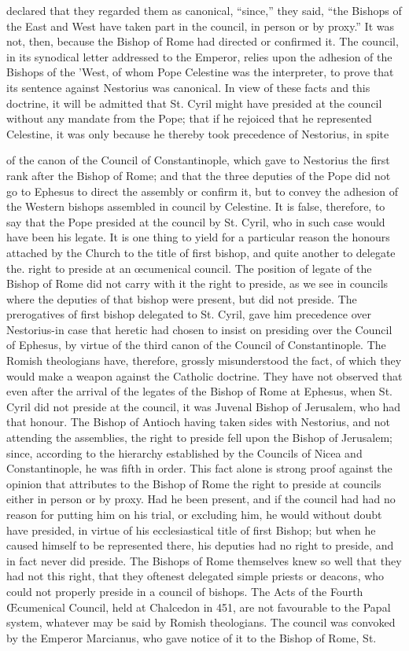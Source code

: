 declared that they regarded them as canonical, “since,” they said, “the Bishops of the East and West have taken part in the council, in person or by proxy.” It was not, then, because the Bishop of Rome had directed or confirmed it. The council, in its synodical letter addressed to the Emperor, relies upon the adhesion of the Bishops of the 'West, of whom Pope Celestine was the interpreter, to prove that its sentence against Nestorius was canonical. In view of these facts and this doctrine, it will be admitted that St. Cyril might have presided at the council without any mandate from the Pope; that if he rejoiced that he represented Celestine, it was only because he thereby took precedence of Nestorius, in spite

of the canon of the Council of Constantinople, which gave to Nestorius the first rank after the Bishop of Rome; and that the three deputies of the Pope did not go to Ephesus to direct the assembly or confirm it, but to convey the adhesion of the Western bishops assembled in council by Celestine. It is false, therefore, to say that the Pope presided at the council by St. Cyril, who in such case would have been his legate. It is one thing to yield for a particular reason the honours attached by the Church to the title of first bishop, and quite another to delegate the. right to preside at an œcumenical council. The position of legate of the Bishop of Rome did not carry with it the right to preside, as we see in councils where the deputies of that bishop were present, but did not preside. The prerogatives of first bishop delegated to St. Cyril, gave him precedence over Nestorius-in case that heretic had chosen to insist on presiding over the Council of Ephesus, by virtue of the third canon of the Council of Constantinople. The Romish theologians have, therefore, grossly misunderstood the fact, of which they would make a weapon against the Catholic doctrine. They have not observed that even after the arrival of the legates of the Bishop of Rome at Ephesus, when St. Cyril did not preside at the council, it was Juvenal Bishop of Jerusalem, who had that honour. The Bishop of Antioch having taken sides with Nestorius, and not attending the assemblies, the right to preside fell upon the Bishop of Jerusalem; since, according to the hierarchy established by the Councils of Nicea and Constantinople, he was fifth in order. This fact alone is strong proof against the opinion that attributes to the Bishop of Rome the right to preside at councils either in person or by proxy. Had he been present, and if the council had had no reason for putting him on his trial, or excluding him, he would without doubt have presided, in virtue of his ecclesiastical title of first Bishop; but when he caused himself to be represented there, his deputies had no right to preside, and in fact never did preside. The Bishops of Rome themselves knew so well that they had not this right, that they oftenest delegated simple priests or deacons, who could not properly preside in a council of bishops. The Acts of the Fourth Œcumenical Council, held at Chalcedon in 451, are not favourable to the Papal system, whatever may be said by Romish theologians. The council was convoked by the Emperor Marcianus, who gave notice of it to the Bishop of Rome, St. 